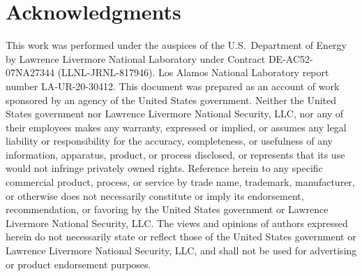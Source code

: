 \documentclass[a4paper,10pt]{article}
\begin{document}
\section*{Acknowledgments}

This work was performed under the auspices of the U.S.\ Department of Energy by Lawrence Livermore National Laboratory under Contract DE-AC52-07NA27344 (LLNL-JRNL-817946).
Los Alamos National Laboratory report number LA-UR-20-30412.
This document was prepared as an account of work sponsored by an agency of the United States government.
Neither the United States government nor Lawrence Livermore National Security, LLC, nor any of their employees makes any warranty, expressed or implied, or assumes any legal liability or responsibility for the accuracy, completeness, or usefulness of any information, apparatus, product, or process disclosed, or represents that its use would not infringe privately owned rights.
Reference herein to any specific commercial product, process, or service by trade name, trademark, manufacturer, or otherwise does not necessarily constitute or imply its endorsement, recommendation, or favoring by the United States government or Lawrence Livermore National Security, LLC.
The views and opinions of authors expressed herein do not necessarily state or reflect those of the United States government or Lawrence Livermore National Security, LLC, and shall not be used for advertising or product endorsement purposes.





\end{document}
